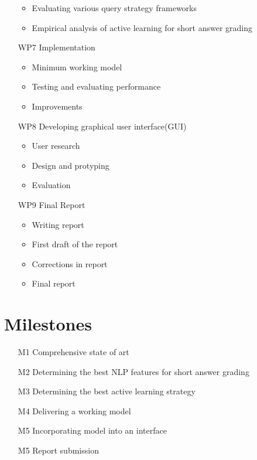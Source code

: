 \documentclass[rnd]{mas_proposal}
\begin{document}
\begin{enumerate}
	\begin{itemize}
    \item Evaluating various query strategy frameworks
    \item Empirical analysis of active learning for short answer grading
    \end{itemize}
	\item[WP7] Implementation
	\begin{itemize}
    \item Minimum working model
    \item Testing and evaluating performance
    \item Improvements
    \end{itemize}
	\item[WP8] Developing graphical user interface(GUI)
	\begin{itemize}
    \item User research
    \item Design and protyping
    \item Evaluation
    \end{itemize}
	\item[WP9] Final Report
	\begin{itemize}
    \item Writing report
    \item First draft of the report
    \item Corrections in report
    \item Final report
    \end{itemize}
\end{enumerate}



\section{Milestones}
\begin{enumerate}
    \item[M1] Comprehensive state of art
    \item[M2] Determining the best NLP features for short answer grading
    \item[M3] Determining the best active learning strategy
    \item[M4] Delivering a working model
    \item[M5] Incorporating model into an interface
    \item[M5] Report submission
\end{enumerate}
\newpage
\end{document}
